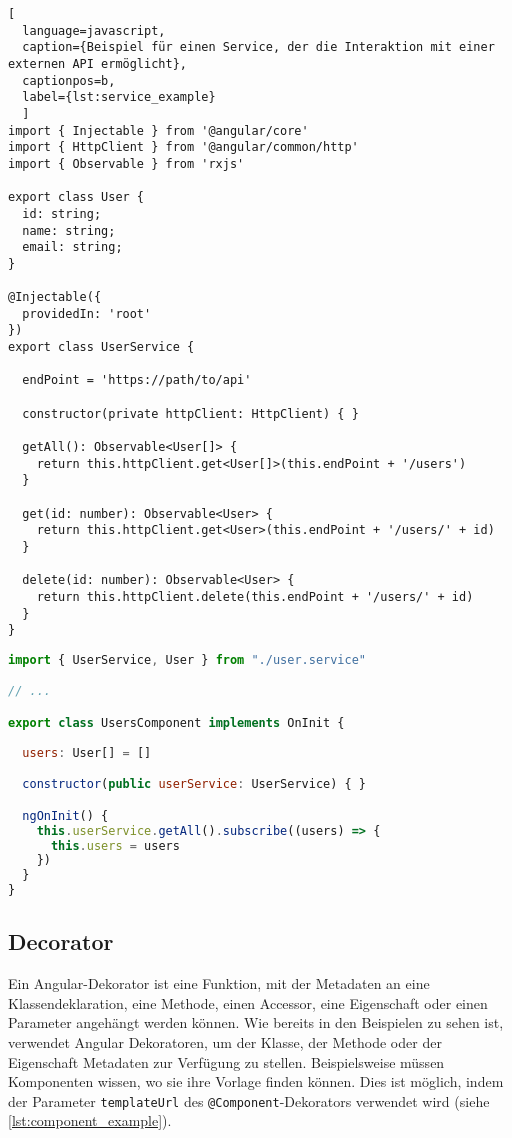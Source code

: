 \begin{lstlisting}[
  language=javascript,
  caption={Beispiel für einen Service, der die Interaktion mit einer externen API ermöglicht},
  captionpos=b,
  label={lst:service_example}
  ]
import { Injectable } from '@angular/core'
import { HttpClient } from '@angular/common/http'
import { Observable } from 'rxjs'

export class User {
  id: string;
  name: string;
  email: string;
}

@Injectable({
  providedIn: 'root'
})
export class UserService {

  endPoint = 'https://path/to/api'

  constructor(private httpClient: HttpClient) { }

  getAll(): Observable<User[]> {
    return this.httpClient.get<User[]>(this.endPoint + '/users')
  }

  get(id: number): Observable<User> {
    return this.httpClient.get<User>(this.endPoint + '/users/' + id)
  }  

  delete(id: number): Observable<User> {
    return this.httpClient.delete(this.endPoint + '/users/' + id)
  }
}
\end{lstlisting}

\begin{lstlisting}[language=javascript,caption={Vereinfachtes Beispiel für die Nutzung des Service definiert in \ref{lst:service_example}},captionpos=b]
import { UserService, User } from "./user.service"

// ...

export class UsersComponent implements OnInit {
  
  users: User[] = []

  constructor(public userService: UserService) { }

  ngOnInit() {
    this.userService.getAll().subscribe((users) => {
      this.users = users
    })    
  }  
}
\end{lstlisting}

\subsection{Decorator}

Ein Angular-Dekorator ist eine Funktion, mit der Metadaten an eine Klassendeklaration, eine Methode, einen Accessor, eine Eigenschaft oder einen Parameter angehängt werden können.
Wie bereits in den Beispielen zu sehen ist, verwendet Angular Dekoratoren, um der Klasse, der Methode oder der Eigenschaft Metadaten zur Verfügung zu stellen.
Beispielsweise müssen Komponenten wissen, wo sie ihre Vorlage finden können. Dies ist möglich, indem der Parameter \lstinline{templateUrl} des \lstinline{@Component}-Dekorators verwendet wird (siehe \ref{lst:component_example}).